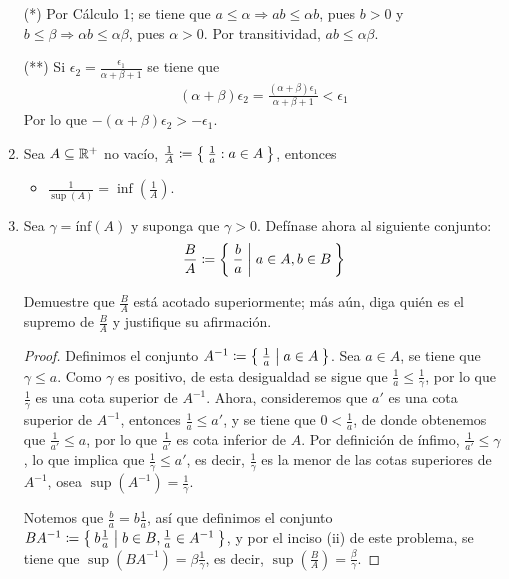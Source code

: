 \begin{enumerate}[label=\alph*)]
  (*) Por Cálculo 1; se tiene que $a \leq \alpha \Rightarrow ab \leq \alpha b$, pues $b>0$ y $b \leq \beta \Rightarrow \alpha b \leq \alpha \beta$, pues $\alpha>0$. Por transitividad, $ab\leq \alpha \beta$.
  
  (**) Si $\epsilon_2 = \frac{\epsilon_1}{\alpha+\beta+1}$ se tiene que
  \begin{align*}
    (\alpha+\beta)\epsilon_2 = \frac{(\alpha+\beta)\epsilon_1}{\alpha+\beta+1} < \epsilon_1
  \end{align*}
  Por lo que $-(\alpha+\beta)\epsilon_2 > - \epsilon_1$.
  
  \item Sea $A\subseteq \mathbb{R}^+$ no vacío, $\frac{1}{A} \coloneqq \Set{\frac{1}{a}: a\in A}$, entonces
  \begin{itemize}
    \item $\frac{1}{\sup(A)} = \inf(\frac{1}{A})$.
  \end{itemize}
  
  \item Sea $\gamma=\text{ínf}(A)$ y suponga que $\gamma>0$. Defínase ahora al siguiente conjunto: \[\frac{B}{A} \coloneqq \Set{\frac{b}{a}| a\in A, b\in B}\]
  
  Demuestre que $\frac{B}{A}$ está acotado superiormente; más aún, diga quién es el supremo de $\frac{B}{A}$ y justifique su afirmación.
  
  \begin{proof}\leavevmode
    Definimos el conjunto $A^{-1} \coloneqq \Set{\frac{1}{a}| a\in A}$. Sea $a\in A$, se tiene que $\gamma \leq a$. Como $\gamma$ es positivo, de esta desigualdad se sigue que $\frac{1}{a} \leq \frac{1}{\gamma}$, por lo que $\frac{1}{\gamma}$ es una cota superior de $A^{-1}$. Ahora, consideremos que $a'$ es una cota superior de $A^{-1}$, entonces $\frac{1}{a} \leq a'$, y se tiene que $0<\frac{1}{a}$, de donde obtenemos que $\frac{1}{a'} \leq a$, por lo que $\frac{1}{a'}$ es cota inferior de $A$. Por definición de ínfimo, $\frac{1}{a'}\leq \gamma$, lo que implica que $\frac{1}{\gamma} \leq a'$, es decir, $\frac{1}{\gamma}$ es la menor de las cotas superiores de $A^{-1}$, osea $\sup(A^{-1})=\frac{1}{\gamma}$.
    
    Notemos que $\frac{b}{a} = b\frac{1}{a}$, así que definimos el conjunto $BA^{-1}\coloneqq \Set{b\frac{1}{a}|b\in B, \frac{1}{a}\in A^{-1}}$, y por el inciso (ii) de este problema, se tiene que $\sup(BA^{-1})=\beta \frac{1}{\gamma}$, es decir, $\sup(\frac{B}{A})=\frac{\beta}{\gamma}$.
  \end{proof}
  

\end{enumerate}

